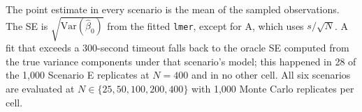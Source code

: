 \begin{table}[h]
\centering
\small
\caption{Scenarios A - F progressively enrich the fitted random-effects model. Each row indicates the factorial dimensions the scenario samples, the random effects it adds, the variance it then captures, and what remains uncaptured.}
\label{tab:underestimation_scenarios}
\end{table}

The point estimate in every scenario is the mean of the sampled observations. The SE is $\sqrt{\text{Var}(\hat\beta_0)}$ from the fitted \texttt{lmer}, except for A, which uses $s/\sqrt{N}$. A fit that exceeds a 300-second timeout falls back to the oracle SE computed from the true variance components under that scenario's model; this happened in 28 of the 1,000 Scenario E replicates at $N = 400$ and in no other cell. All six scenarios are evaluated at $N \in \{25, 50, 100, 200, 400\}$ with 1,000 Monte Carlo replicates per cell.


